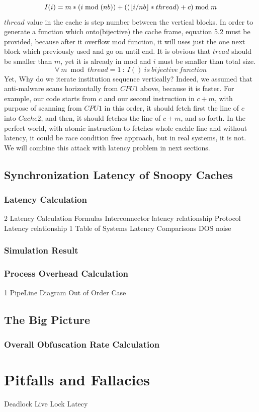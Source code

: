 \begin{equation}
	I(i)=m*(i\bmod{(nb)})+((\left \lfloor i/nb \right \rfloor*thread)+c)\bmod{m}\\ 
\end{equation}
$thread$ value in the cache is step number between the vertical blocks. In order to generate a function which onto(bijective) the cache frame, equation 5.2 must be provided, because after it overflow mod function, it will uses just the one next block which previously used and go on until end. It is obvious that $tread$ should be smaller than $m$, yet it is already in mod and $i$ must be smaller than total size. 
\begin{equation}
	\forall\: m\bmod thread = 1\ :\  I()\ is\ bijective\ function
\end{equation}
Yet, Why do we iterate institution sequence  vertically? Indeed, we assumed that anti-malware scans horizontally from $CPU1$ above, because it is faster. For example, our code starts from $c$ and our second instruction in $c+m$, with purpose of scanning from $CPU1$ in this order, it should  fetch first the line of $c$ into $Cache2$, and then, it should fetches the line of $c+m$, and so forth. In the perfect world, with atomic instruction to fetches whole cachle line and without latency, it could be race condition free approach, but in real systems, it is not. We will combine this attack with latency problem in next sections.
\subsection{Synchronization Latency of Snoopy Caches}
\subsubsection{Latency Calculation}
2 Latency Calculation Formulas
Interconnector latency relationship
Protocol Latency relationship
1 Table of Systems Latency Comparisons
DOS noise 
\subsubsection*{Simulation Result}
\subsubsection{Process Overhead Calculation}
1 PipeLine Diagram
Out of Order Case
\subsection{The Big Picture}
\subsubsection{Overall Obfuscation Rate Calculation}
\section{Pitfalls and Fallacies}
Deadlock Live Lock
Latecy 
